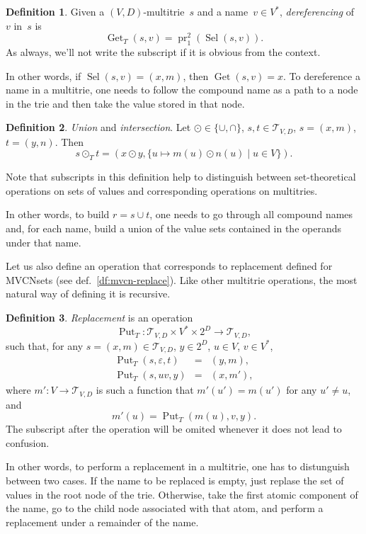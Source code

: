 \documentclass{article}
\theoremstyle{definition}
\newtheorem{Df}{Definition}
\newcommand{\setcharmt}{T}
\newcommand{\setsymbol}[3]{\mathcal{#1}_{#2,#3}}
\newcommand{\setmt}[2]{\setsymbol{\setcharmt}{#1}{#2}}
\newcommand{\select}{\operatorname{Sel}}
\newcommand{\deref}{\operatorname{Get}}
\newcommand{\putval}{\operatorname{Put}}
\newcommand{\proj}[2]{\operatorname{pr}^{#1}_{#2}}
\begin{document}
\begin{Df}\label{df:mt-deref}
Given a $(V,D)$-multitrie~$s$ and a name~$v\in V^\ast$, \emph{dereferencing}
of~$v$ in~$s$ is
\[
  \deref_\setcharmt(s, v) = \proj{2}{1}(\select(s, v)) .
\]
As always, we'll not write the subscript if it is obvious from the context.
\end{Df}

In other words, if $\select(s,v) = (x,m)$, then $\deref(s, v) = x$. To
dereference a name in a multitrie, one needs to follow the compound name
as a path to a node in the trie and then take the value stored in that node.

\begin{Df}\label{df:mt-setop}
\emph{Union} and \emph{intersection}.
Let
$\odot \in \{ \cup, \cap \}$,
$s, t \in \setmt{V}{D}$,
$s = (x, m)$, $t = (y, n)$.
Then
\[
  s \odot_\setcharmt  t =
    (x \odot y, \{ u \mapsto m(u) \odot n(u) \mid u \in V \}) .
\]
\end{Df}
Note that subscripts in this definition help to distinguish between
set-theoretical operations on sets of values and corresponding operations
on multitries.

In other words, to build $r = s \cup t$, one needs to go through all compound
names and, for each name, build a union of the value sets contained in the
operands under that name.

Let us also define an operation that corresponds to replacement
defined for MVCNsets (see def.~\ref{df:mvcn-replace}). Like other multitrie
operations, the most natural way of defining it is recursive.

\begin{Df}\label{df:mt-replace}
\emph{Replacement} is an operation
\[
  \putval_\setcharmt : \setmt{V}{D} \times V^\ast \times 2^D \to \setmt{V}{D},
\]
such that, for any
$s = (x, m) \in \setmt{V}{D}$, $y \in 2^D$, $u \in V$, $v \in V^\ast$,
\begin{eqnarray*}
  \putval_\setcharmt(s, \varepsilon, t) & = & (y, m) , \\
  \putval_\setcharmt(s, u v, y) & = & (x, m') ,
\end{eqnarray*}
where $m' : V \to \setmt{V}{D}$ is such a function that $m'(u') = m(u')$ for any
$u'\neq u$, and
\[
  m'(u) = \putval_\setcharmt(m(u), v, y) .
\]
The subscript after the operation will be omited whenever it does not lead to
confusion.
\end{Df}

In other words, to perform a replacement in a multitrie, one has to distunguish
between two cases. If the name to be replaced is empty, just replase the set of
values in the root node of the trie. Otherwise, take the first atomic component
of the name, go to the child node associated with that atom, and perform a
replacement under a remainder of the name.
\end{document}
